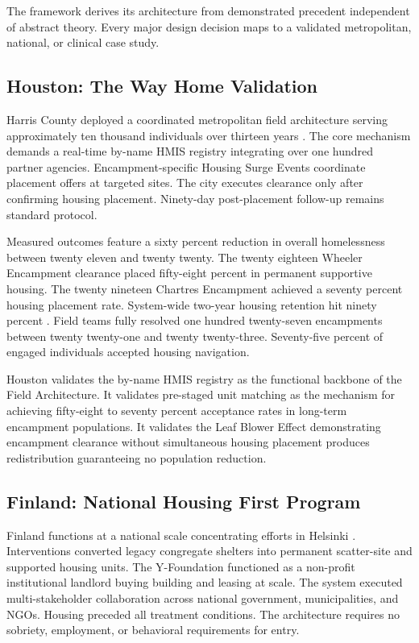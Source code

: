 \documentclass[12pt, letterpaper]{article}
\begin{document}
The framework derives its architecture from demonstrated precedent independent of abstract theory. Every major design decision maps to a validated metropolitan, national, or clinical case study.

\subsection{Houston: The Way Home Validation}

Harris County deployed a coordinated metropolitan field architecture serving approximately ten thousand individuals over thirteen years \citep{houston_way_home_2024}. The core mechanism demands a real-time by-name HMIS registry integrating over one hundred partner agencies. Encampment-specific Housing Surge Events coordinate placement offers at targeted sites. The city executes clearance only after confirming housing placement. Ninety-day post-placement follow-up remains standard protocol.

Measured outcomes feature a sixty percent reduction in overall homelessness between twenty eleven and twenty twenty. The twenty eighteen Wheeler Encampment clearance placed fifty-eight percent in permanent supportive housing. The twenty nineteen Chartres Encampment achieved a seventy percent housing placement rate. System-wide two-year housing retention hit ninety percent \citep{houston_way_home_2024}. Field teams fully resolved one hundred twenty-seven encampments between twenty twenty-one and twenty twenty-three. Seventy-five percent of engaged individuals accepted housing navigation.

Houston validates the by-name HMIS registry as the functional backbone of the Field Architecture. It validates pre-staged unit matching as the mechanism for achieving fifty-eight to seventy percent acceptance rates in long-term encampment populations. It validates the Leaf Blower Effect demonstrating encampment clearance without simultaneous housing placement produces redistribution guaranteeing no population reduction.

\subsection{Finland: National Housing First Program}

Finland functions at a national scale concentrating efforts in Helsinki \citep{finland_housing_first_2023}. Interventions converted legacy congregate shelters into permanent scatter-site and supported housing units. The Y-Foundation functioned as a non-profit institutional landlord buying building and leasing at scale. The system executed multi-stakeholder collaboration across national government, municipalities, and NGOs. Housing preceded all treatment conditions. The architecture requires no sobriety, employment, or behavioral requirements for entry.
\end{document}
